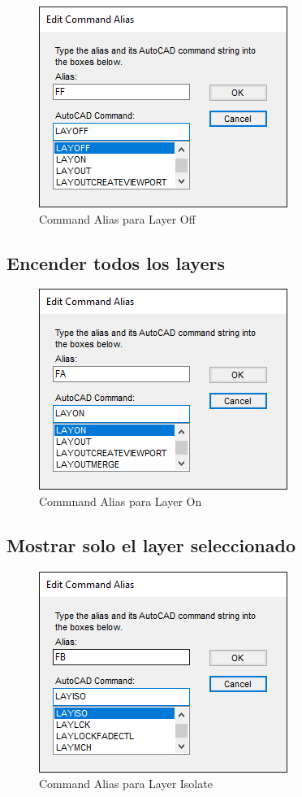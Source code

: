 \documentclass[12pt,letterpaper,final]{report}
\begin{document}
\begin{figure}[H]
	\centering
	\includegraphics[width=0.55\linewidth, height=0.45\textheight,keepaspectratio]{Imagenes/autocad_alias_layeroptions_01}
	\caption{Command Alias para Layer Off}
	\label{fig:autocadaliaslayeroptions01}
\end{figure}

\subsection{Encender todos los layers}

\begin{figure}[H]
	\centering
	\includegraphics[width=0.55\linewidth, height=0.45\textheight,keepaspectratio]{Imagenes/autocad_alias_layeroptions_02}
	\caption{Commnand Alias para Layer On}
\end{figure}

\subsection{Mostrar solo el layer seleccionado}

\begin{figure}[H]
	\centering
	\includegraphics[width=0.55\linewidth, height=0.45\textheight,keepaspectratio]{Imagenes/autocad_alias_layeroptions_03}
	\caption{Command Alias para Layer Isolate}
	\label{fig:autocadaliaslayeroptions03}
\end{figure}
\end{document}
